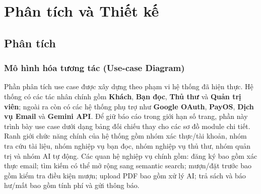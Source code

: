 \chapter{Phân tích và Thiết kế}
\label{chap:PhanTichVaThietKe}

\section{Phân tích}
\label{sec:PhanTich}

\subsection{Mô hình hóa tương tác (Use-case Diagram)}
\label{subsec:BieuDoCaSuDung}

Phần phân tích use case được xây dựng theo phạm vi hệ thống đã hiện thực. Hệ
thống có các tác nhân chính gồm \textbf{Khách}, \textbf{Bạn đọc},
\textbf{Thủ thư} và \textbf{Quản trị viên}; ngoài ra còn có các hệ thống phụ
trợ như \textbf{Google OAuth}, \textbf{PayOS}, \textbf{Dịch vụ Email} và
\textbf{Gemini API}. Để giữ báo cáo trong giới hạn số trang, phần này trình bày
use case dưới dạng bảng đối chiếu thay cho các sơ đồ module chi tiết. Ranh giới
chức năng chính của hệ thống gồm nhóm xác thực/tài khoản, nhóm tra cứu tài liệu,
nhóm nghiệp vụ bạn đọc, nhóm nghiệp vụ thủ thư, nhóm quản trị và nhóm AI tự
động. Các quan hệ nghiệp vụ chính gồm: đăng ký bao gồm xác thực email; tìm kiếm
có thể mở rộng sang semantic search; mượn/đặt trước bao gồm kiểm tra điều kiện
mượn; upload PDF bao gồm xử lý AI; trả sách và báo hư/mất bao gồm tính phí và
gửi thông báo.

